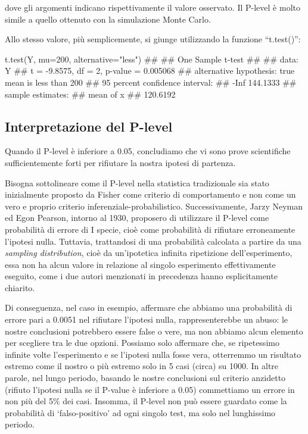 \documentclass[a4paper,12pt,oneside]{book}
\newenvironment{Shaded}{}{}
\newcommand{\KeywordTok}[1]{#1}
\newcommand{\DataTypeTok}[1]{#1}
\newcommand{\DecValTok}[1]{#1}
\newcommand{\StringTok}[1]{#1}
\newcommand{\CommentTok}[1]{#1}
\newcommand{\NormalTok}[1]{#1}
\begin{document}
dove gli argomenti indicano rispettivamente il valore osservato. Il P-level è molto simile a quello ottenuto con la simulazione Monte Carlo.

Allo stesso valore, più semplicemente, si giunge utilizzando la funzione ``t.test()'':

\begin{Shaded}
\begin{Highlighting}[]
\KeywordTok{t.test}\NormalTok{(Y, }\DataTypeTok{mu=}\DecValTok{200}\NormalTok{, }\DataTypeTok{alternative=}\StringTok{"less"}\NormalTok{)}
\CommentTok{## }
\CommentTok{##  One Sample t-test}
\CommentTok{## }
\CommentTok{## data:  Y}
\CommentTok{## t = -9.8575, df = 2, p-value = 0.005068}
\CommentTok{## alternative hypothesis: true mean is less than 200}
\CommentTok{## 95 percent confidence interval:}
\CommentTok{##      -Inf 144.1333}
\CommentTok{## sample estimates:}
\CommentTok{## mean of x }
\CommentTok{##  120.6192}
\end{Highlighting}
\end{Shaded}

\hypertarget{interpretazione-del-p-level}{%
\subsection{Interpretazione del P-level}\label{interpretazione-del-p-level}}

Quando il P-level è inferiore a 0.05, concludiamo che vi sono prove scientifiche sufficientemente forti per rifiutare la nostra ipotesi di partenza.

Bisogna sottolineare come il P-level nella statistica tradizionale sia stato inizialmente proposto da Fisher come criterio di comportamento e non come un vero e proprio criterio inferenziale-probabilistico. Successivamente, Jarzy Neyman ed Egon Pearson, intorno al 1930, proposero di utilizzare il P-level come probabilità di errore di I specie, cioè come probabilità di rifiutare erroneamente l'ipotesi nulla. Tuttavia, trattandosi di una probabilità calcolata a partire da una \emph{sampling distribution}, cioè da un'ipotetica infinita ripetizione dell'esperimento, essa non ha alcun valore in relazione al singolo esperimento effettivamente eseguito, come i due autori menzionati in precedenza hanno esplicitamente chiarito.

Di conseguenza, nel caso in esempio, affermare che abbiamo una probabilità di errore pari a 0.0051 nel rifiutare l'ipotesi nulla, rappresenterebbe un abuso: le nostre conclusioni potrebbero essere false o vere, ma non abbiamo alcun elemento per scegliere tra le due opzioni. Possiamo solo affermare che, se ripetessimo infinite volte l'esperimento e se l'ipotesi nulla fosse vera, otterremmo un risultato estremo come il nostro o più estremo solo in 5 casi (circa) su 1000. In altre parole, nel lungo periodo, basando le nostre conclusioni sul criterio anzidetto (rifiuto l'ipotesi nulla se il P-value è inferiore a 0.05) commettiamo un errore in non più del 5\% dei casi. Insomma, il P-level non può essere guardato come la probabilità di `falso-positivo' ad ogni singolo test, ma solo nel lunghissimo periodo.
\end{document}
